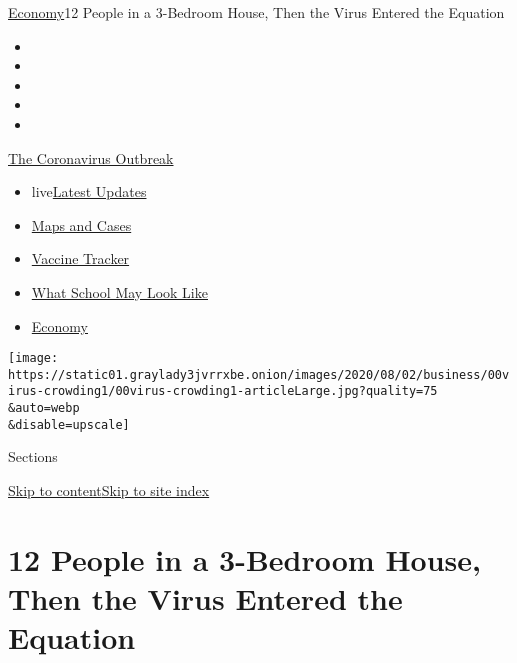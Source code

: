 \href{/section/business/economy}{Economy}\textbar{}12 People in a
3-Bedroom House, Then the Virus Entered the Equation

\begin{itemize}
\item
\item
\item
\item
\item
\end{itemize}

\href{https://www.nytimes3xbfgragh.onion/news-event/coronavirus?action=click\&pgtype=Article\&state=default\&region=TOP_BANNER\&context=storylines_menu}{The
Coronavirus Outbreak}

\begin{itemize}
\tightlist
\item
  live\href{https://www.nytimes3xbfgragh.onion/2020/08/01/world/coronavirus-covid-19.html?action=click\&pgtype=Article\&state=default\&region=TOP_BANNER\&context=storylines_menu}{Latest
  Updates}
\item
  \href{https://www.nytimes3xbfgragh.onion/interactive/2020/us/coronavirus-us-cases.html?action=click\&pgtype=Article\&state=default\&region=TOP_BANNER\&context=storylines_menu}{Maps
  and Cases}
\item
  \href{https://www.nytimes3xbfgragh.onion/interactive/2020/science/coronavirus-vaccine-tracker.html?action=click\&pgtype=Article\&state=default\&region=TOP_BANNER\&context=storylines_menu}{Vaccine
  Tracker}
\item
  \href{https://www.nytimes3xbfgragh.onion/interactive/2020/07/29/us/schools-reopening-coronavirus.html?action=click\&pgtype=Article\&state=default\&region=TOP_BANNER\&context=storylines_menu}{What
  School May Look Like}
\item
  \href{https://www.nytimes3xbfgragh.onion/live/2020/07/31/business/stock-market-today-coronavirus?action=click\&pgtype=Article\&state=default\&region=TOP_BANNER\&context=storylines_menu}{Economy}
\end{itemize}

\texttt{[image: https://static01.graylady3jvrrxbe.onion/images/2020/08/02/business/00virus-crowding1/00virus-crowding1-articleLarge.jpg?quality=75\\\&auto=webp\\\&disable=upscale]}

Sections

\protect\hyperlink{site-content}{Skip to
content}\protect\hyperlink{site-index}{Skip to site index}

\hypertarget{12-people-in-a-3-bedroom-house-then-the-virus-entered-the-equation}{%
\section{12 People in a 3-Bedroom House, Then the Virus Entered the
Equation}\label{12-people-in-a-3-bedroom-house-then-the-virus-entered-the-equation}}

